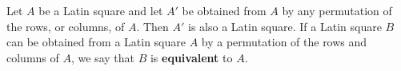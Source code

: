 Let $A$ be a Latin square and let $A'$ be obtained from $A$ by any permutation of the rows, or columns, of $A$. Then $A'$ is also a Latin square. If a Latin square $B$ can be obtained from a Latin square $A$ by a permutation of the rows and columns of $A$, we say that $B$ is \textbf{equivalent} to $A$.
